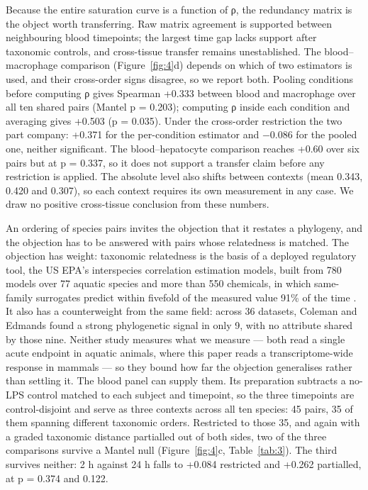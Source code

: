 \documentclass[11pt,a4paper]{article}
\begin{document}
Because the entire saturation curve is a function of ρ, the redundancy
matrix is the object worth transferring. Raw matrix agreement is
supported between neighbouring blood timepoints; the largest time gap
lacks support after taxonomic controls, and cross-tissue transfer
remains unestablished. The blood--macrophage comparison (Figure~\ref{fig:4}d)
depends on which of two estimators is used, and their cross-order signs
disagree, so we report both. Pooling conditions before computing ρ gives
Spearman +0.333 between blood and macrophage over all ten shared pairs
(Mantel p = 0.203); computing ρ inside each condition and averaging
gives +0.503 (p = 0.035). Under the cross-order restriction the two part
company: +0.371 for the per-condition estimator and −0.086 for the
pooled one, neither significant. The blood--hepatocyte comparison
reaches +0.60 over six pairs but at p = 0.337, so it does not support a
transfer claim before any restriction is applied. The absolute level
also shifts between contexts (mean 0.343, 0.420 and 0.307), so each
context requires its own measurement in any case. We draw no positive
cross-tissue conclusion from these numbers.

An ordering of species pairs invites the objection that it restates a
phylogeny, and the objection has to be answered with pairs whose
relatedness is matched. The objection has weight: taxonomic relatedness
is the basis of a deployed regulatory tool, the US EPA's interspecies
correlation estimation models, built from 780 models over 77 aquatic
species and more than 550 chemicals, in which same-family surrogates
predict within fivefold of the measured value 91\% of the time \cite{ref41}.
It also has a counterweight from the same field: across 36 datasets,
Coleman and Edmands \cite{ref42} found a strong phylogenetic signal in only
9, with no attribute shared by those nine. Neither study measures what
we measure --- both read a single acute endpoint in aquatic animals,
where this paper reads a transcriptome-wide response in mammals --- so
they bound how far the objection generalises rather than settling it.
The blood panel can supply them. Its preparation subtracts a no-LPS
control matched to each subject and timepoint, so the three timepoints
are control-disjoint and serve as three contexts across all ten species:
45 pairs, 35 of them spanning different taxonomic orders. Restricted to
those 35, and again with a graded taxonomic distance partialled out of
both sides, two of the three comparisons survive a Mantel null (Figure~\ref{fig:4}c, Table~\ref{tab:3}). The third survives neither: 2 h against 24 h falls to
+0.084 restricted and +0.262 partialled, at p = 0.374 and 0.122.
\end{document}
